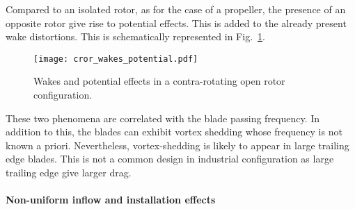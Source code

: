 Compared to an isolated rotor, as for the case of a propeller,
the presence of an opposite rotor give rise to potential effects.
This is added to the already present wake distortions. This is
schematically represented in Fig.~\ref{fig:cror_wakes_potential}.
\begin{figure}[htb]
  \centering
  \texttt{[image: cror\_wakes\_potential.pdf]}
  \caption{Wakes and potential effects in a 
  contra-rotating open rotor configuration.}
  \label{fig:cror_wakes_potential}
\end{figure}
These two phenomena are correlated with the blade passing frequency.
In addition to this, the blades can exhibit vortex shedding whose frequency
is not known a priori.
Nevertheless,
vortex-shedding is likely to appear in large trailing edge blades.
This is not a common design in industrial configuration as large trailing edge
give larger drag.

\paragraph{Non-uniform inflow and installation effects}
